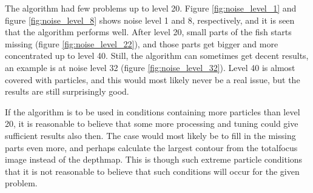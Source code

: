 The algorithm had few problems up to level 20. Figure \ref{fig:noise_level_1} and figure \ref{fig:noise_level_8} shows noise level 1 and 8, respectively, and it is seen that the algorithm performs well. After level 20, small parts of the fish starts missing (figure \ref{fig:noise_level_22}), and those parts get bigger and more concentrated up to level 40. Still, the algorithm can sometimes get decent results, an example is at noise level 32 (figure \ref{fig:noise_level_32}). Level 40 is almost covered with particles, and this would most likely never be a real issue, but the results are still surprisingly good.

If the algorithm is to be used in conditions containing more particles than level 20, it is reasonable to believe that some more processing and tuning could give sufficient results also then. The case would most likely be to fill in the missing parts even more, and perhaps calculate the largest contour from the totalfocus image instead of the depthmap. This is though such extreme particle conditions that it is not reasonable to believe that such conditions will occur for the given problem.


